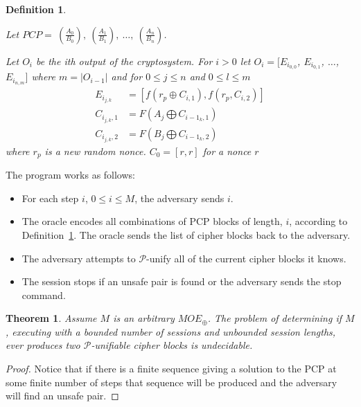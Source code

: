 \documentclass{easychair}
\newtheorem{definition}{Definition}
\newtheorem{theorem}{Theorem}
\begin{document}
\begin{definition}\label{det-func}
	
	Let $PCP = ~(\frac{A_0}{B_0}), ~(\frac{A_1}{B_1}), ~\ldots, ~(\frac{A_n}{B_n})$. 	
	
	Let $O_i$ be the ith output of the cryptosystem. 
	For $i > 0$ let $O_i = [E_{i_{0,0}}$, $E_{i_{0,1}}$, $\ldots$,
	$E_{i_{n,m}}]$ where $m = |O_{i-1}|$ and for 
	$0 \leq j \leq n$ and $0 \leq l \leq m$
	\begin{align*}
	E_{i_{j,k}} &= [f(r_p \oplus C_{i, 1}), f(r_p, C_{i,2}) ] \\
	C_{i_{j,k},1} &= F(A_j \bigoplus C_{i-1_{k}, 1})	\\
	C_{i_{j,k},2} &= F(B_j \bigoplus C_{i-1_{k}, 2}) 
	\end{align*}
	where $r_p$ is a new random nonce.
	$C_0 = [r,r]$ for a nonce $r$
\end{definition}
 
The program works as follows:
\begin{itemize}
	\item For each step $i$, $0 \leq i \leq M$, the adversary
	sends $i$.
	\item The oracle encodes all combinations of PCP blocks
	of length, $i$, according to Definition~\ref{det-func}.
	The oracle sends the list of cipher blocks back to
	the adversary.
	\item The adversary attempts to $\mathcal{P}$-unify 
	all of the current cipher blocks it knows.
	\item The session stops if an unsafe pair is found or 
	the adversary sends the stop command. 
\end{itemize}

\begin{theorem}
	Assume $M$ is an arbitrary $MOE_{\oplus}$. The problem
	of determining if $M$, executing with 
	a bounded number of sessions and unbounded session
	lengths, ever produces two  $\mathcal{P}$-unifiable cipher blocks is undecidable. 
\end{theorem}
\begin{proof}
	Notice that if there is a finite sequence giving a solution
	to the PCP at some finite number of steps that sequence will
	be produced and the adversary will find an unsafe pair.  
\end{proof}
\end{document}
